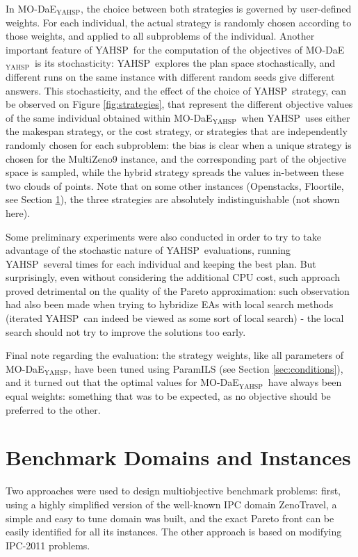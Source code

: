 \documentclass[letterpaper]{article}
\def\YAHSP{{\sc YAHSP}}
\newcommand{\MODAEYAHSP}{{\sc MO-DaE$_{\text{YAHSP}}$}}
\def\MULTIZENO{{\sc MultiZeno}}
\def\WMAKESPAN{{W-makespan}}
\def\WCOST{{W-cost}}
\newcommand{\ZENOTRAVEL}{{\sc ZenoTravel}}
\newcommand{\OPENSTACKS}{{\sc Openstacks}}
\newcommand{\FLOORTILE}{{\sc Floortile}}
\begin{document}
In \MODAEYAHSP, the choice between both strategies is governed by user-defined weights.
For each individual, the actual strategy is randomly chosen according to those weights, and applied to all subproblems of the individual. Another important feature of \YAHSP\ for the computation of the objectives of \MODAEYAHSP\ is its stochasticity: \YAHSP\ explores the plan space stochastically, and different runs on the same instance with different random seeds give different answers. This stochasticity, and the effect of the choice of \YAHSP\ strategy, %
can be observed on Figure \ref{fig:strategies}, that represent the different objective values of the same individual obtained within \MODAEYAHSP\ when \YAHSP\ uses either the makespan strategy, or the cost strategy, or strategies that are independently randomly chosen for each subproblem: the bias is clear when a unique strategy is chosen for the \MULTIZENO9 instance, and the corresponding part of the objective space is sampled, while the hybrid strategy spreads the values in-between these two clouds of points. Note that on some other instances (\OPENSTACKS, \FLOORTILE, see Section \ref{sec:benchmarks}), the three strategies are absolutely indistinguishable (not shown here).

Some preliminary experiments were also conducted in order to try to take advantage of the stochastic nature of \YAHSP\ evaluations, running \YAHSP\ several times for each individual and keeping the best plan. But surprisingly, even without considering the additional CPU cost, such approach proved detrimental on the quality of the Pareto approximation: such observation had also been made when trying to hybridize EAs with local search methods (iterated \YAHSP\ can indeed be viewed as some sort of local search) - the local search should not try to improve the solutions too early.

Final note regarding the evaluation: the strategy weights, like all parameters of \MODAEYAHSP, have been tuned using ParamILS (see Section \ref{sec:conditions}), and it turned out that the optimal values for \MODAEYAHSP\ have always been equal weights: something that was to be expected, as no objective should be preferred to the other. 

\section{Benchmark Domains and Instances}
\label{sec:benchmarks}
Two approaches were used to design multiobjective benchmark problems: first, using a highly simplified version of the well-known IPC domain \ZENOTRAVEL, a simple and easy to tune domain was built, and the exact Pareto front can be easily identified for all its instances. The other approach is based on modifying IPC-2011 problems.
\end{document}
